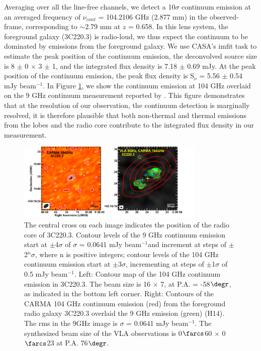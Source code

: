 \documentclass{emulateapj}
\newcommand{\pmOne}{$^{-1}$}
\begin{document}
Averaging over all the line-free channels, we detect a 10$\sigma$ continuum emission at an averaged frequency of $\nu_{cont}$ = 104.2106 GHz (2.877 mm) in the observed-frame, corresponding to $\sim$2.79 mm at $z$ = 0.658. In this lens system, the 
foreground galaxy (3C220.3) is radio-loud, we thus expect the continuum to be dominated by emissions from the foreground galaxy. We use CASA's {\sc imfit} task to estimate the peak position of the continuum emission, the deconvolved source size is 8 $\pm$ 0 $\times$ 3 $\pm$ 1, and the integrated flux density is 7.18 $\pm$ 0.69 mJy. At the peak position of the continuum emission, the peak flux density is S$_\nu$ = 5.56 $\pm$ 0.54 
mJy beam\pmOne.
In Figure \ref{fig:cont}, we show the continuum emission at 104 GHz overlaid on the 9 GHz continuum measurement reported by \citet{Haas14}. This figure demonstrates that at the resolution of our observation, the continuum detection is marginally resolved, it is therefore plausible that both non-thermal and thermal emissions from the lobes and the radio core contribute to the integrated flux density in our measurement.

\begin{figure}[tbph]
\centering
\includegraphics[width=0.80\textwidth]{Figure/ContPanel}
\caption{The central cross on each image indicates the position of the radio core of 3C220.3. Contour levels of the 9 GHz continuum 
emission start at $\pm$4$\sigma$ of $\sigma$ = 0.0641 mJy beam\pmOne and increment at steps of $\pm$2$^n\sigma$, 
where n is positive integers; contour levels of the 104 GHz continuum emission start at $\pm$3$\sigma$, incrementing at steps 
of $\pm$1$\sigma$ of 0.5 mJy beam\pmOne.
Left: Contour map of the 104 GHz continuum emission in 3C220.3. The beam size is 16 $\times$ 7, at P.A. = 
-58$\degr$, as indicated in the bottom left corner. Right: Contours of the CARMA 104 GHz continuum emission (red) from the 
foreground radio galaxy 3C220.3 overlaid the 9 GHz emission (green) (H14). The rms in the 9GHz image is $\sigma$ 
= 0.0641 mJy beam\pmOne. The synthesized beam size of the VLA observations is 0$\farcs$60 $\times$ 0$\farcs$23 at P.A. 
76$\degr$. 
\label{fig:cont}}
\end{figure}
\end{document}

